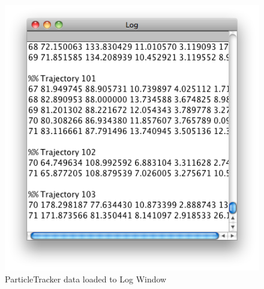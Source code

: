 \documentclass[11pt,a4paper,oneside]{report}
\begin{document}
\begin{figure}[htbp]
\begin{center}
\includegraphics[scale=0.5]{fig/fig264_PTdataLoadedtoLog.png}
\caption{ ParticleTracker data loaded to Log Window}
\label{fig:fig264_PTdatainLogWin}
\end{center}
\end{figure}
\end{document}
